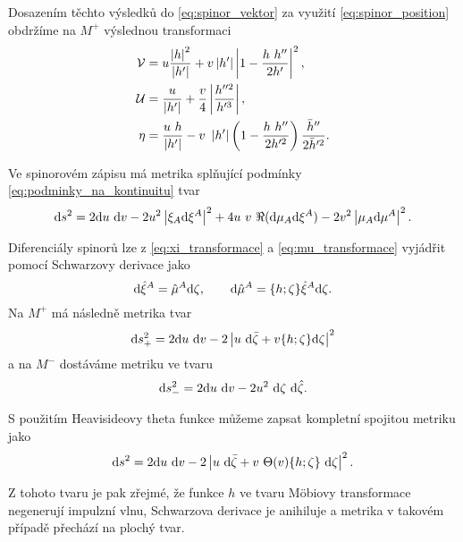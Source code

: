 Dosazením těchto výsledků do \eqref{eq:spinor_vektor} za využití \eqref{eq:spinor_position} obdržíme na $M^+$
výslednou transformaci
\begin{equation}
    \label{eq:refraction_spinor}
    \begin{split}
        \mathcal{V} &= u \frac{\left|h\right|^2}{\left|h'\right|} + v \left| h' \right| \left| 1 - \frac{h ~ h''}{2 h'} \right|^2, \\
        \mathcal{U} &= \frac{u}{\left|h'\right|} + \frac{v}{4} \left| \frac{h''^2}{h'^3}\right|, \\
        \eta &= \frac{u ~ h}{ \left| h' \right|} - v ~ \left| h' \right| \left(1 - \frac{h ~ h''}{2 h'^2} \right) \frac{\bar{h}''}{2 \bar{h}'^2}.
    \end{split}
\end{equation}

Ve spinorovém zápisu má metrika splňující podmínky \eqref{eq:podminky_na_kontinuitu} tvar
\begin{equation}
    \mathrm{d} s^2 = 2 \mathrm{d} u ~ \mathrm{d} v - 2 u^2 \left| \xi_A \mathrm{d} \xi^A \right|^2 + 4 u~v~ \Re(\mathrm{d} \mu_A \mathrm{d} \xi^A) - 2 v^2 \left|\mu_A \mathrm{d} \mu^A\right|^2.
\end{equation}

Diferenciály spinorů lze z \eqref{eq:xi_transformace} a \eqref{eq:mu_transformace} vyjádřit pomocí Schwarzovy derivace jako
\begin{equation}
    \mathrm{d} \hat{\xi}^A = \hat{\mu}^A \mathrm{d} \zeta, ~~~~~~ \mathrm{d} \hat{\mu}^A = \{h; \zeta\} \hat{\xi}^A \mathrm{d} \zeta.
\end{equation}
Na $M^+$ má následně metrika tvar
\begin{equation}
    \mathrm{d} s_+^2 = 2 \mathrm{d} u ~ \mathrm{d} v - 2 \left| u ~ \mathrm{d} \bar{\zeta} + v \{h; \zeta \} \mathrm{d} \zeta \right|^2
\end{equation}
a na $M^-$ dostáváme metriku ve tvaru
\begin{equation}
    \mathrm{d} s_-^2 = 2 \mathrm{d} u ~ \mathrm{d} v - 2 u^2 ~ \mathrm{d} \zeta ~ \mathrm{d} \hat{\zeta}.
\end{equation}

S použitím Heavisideovy theta funkce můžeme zapsat kompletní spojitou metriku
jako
\begin{equation}
    \mathrm{d} s^2 = 2 \mathrm{d} u ~ \mathrm{d} v - 2 \left| u ~ \mathrm{d} \bar{\zeta} + v ~ \Theta(v) \{h;\zeta\} ~ \mathrm{d} \zeta \right|^2.
\end{equation}

Z tohoto tvaru je pak zřejmé, že funkce $h$ ve tvaru Möbiovy transformace negenerují impulzní vlnu,
Schwarzova derivace je anihiluje a metrika v takovém případě přechází na plochý tvar.

